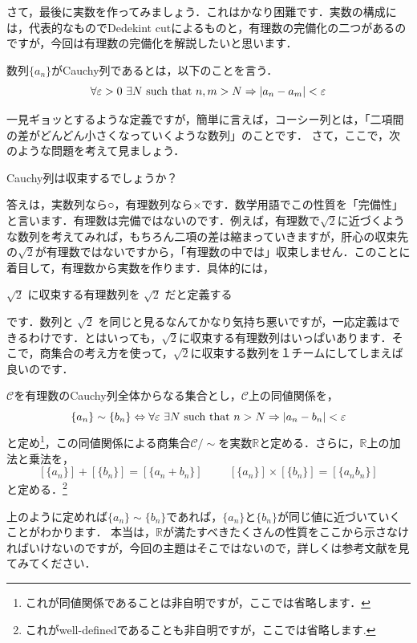 さて，最後に実数を作ってみましょう．これはかなり困難です．実数の構成には，代表的なものでDedekint cutによるものと，有理数の完備化の二つがあるのですが，今回は有理数の完備化を解説したいと思います．
\begin{defi}[Cauchy列]
 数列$\{a_n\}$がCauchy列であるとは，以下のことを言う．
 \[
  \forall \varepsilon >0 \ \exists N\  {\rm such\ that}\ n,m>N \Rightarrow |a_n-a_m|<\varepsilon
 \]
\end{defi}
一見ギョッとするような定義ですが，簡単に言えば，コーシー列とは，「二項間の差がどんどん小さくなっていくような数列」のことです．
さて，ここで，次のような問題を考えて見ましょう．
\begin{center}
 Cauchy列は収束するでしょうか？
\end{center}
答えは，実数列なら○，有理数列なら×です．数学用語でこの性質を「完備性」と言います．有理数は完備ではないのです．例えば，有理数で$\sqrt{2}$に近づくような数列を考えてみれば，もちろん二項の差は縮まっていきますが，肝心の収束先の$\sqrt{2}$が有理数ではないですから，「有理数の中では」収束しません．このことに着目して，有理数から実数を作ります．具体的には，
\begin{center}
  $\sqrt{2}$ に収束する有理数列を $\sqrt{2}$ だと定義する
\end{center}
です．数列と $\sqrt{2}$ を同じと見るなんてかなり気持ち悪いですが，一応定義はできるわけです．とはいっても，$\sqrt{2}$に収束する有理数列はいっぱいあります．そこで，商集合の考え方を使って，$\sqrt{2}$に収束する数列を１チームにしてしまえば良いのです．
\begin{defi}[実数]
$\mathcal{C}$を有理数のCauchy列全体からなる集合とし，$\mathcal{C}$上の同値関係を，
 \[
 \{a_n\}\sim\{b_n\}\Leftrightarrow \forall\varepsilon\  \exists N\  {\rm such\ that}\ n>N\Rightarrow |a_n-b_n|<\varepsilon
 \]
 と定め\footnote{これが同値関係であることは非自明ですが，ここでは省略します．}，この同値関係による商集合$\mathcal{C}/\sim$を実数$\mathbb{R}$と定める．さらに，$\mathbb{R}$上の加法と乗法を，
 \[
  [\{a_n\}]+[\{b_n\}]=[\{a_n+b_n\}]\hspace{1cm}[\{a_n\}]\times[\{b_n\}]=[\{a_nb_n\}]
 \]
 と定める．\footnote{これがwell-definedであることも非自明ですが，ここでは省略します.}
\end{defi}

上のように定めれば$\{a_n\}\sim\{b_n\}$であれば，$\{a_n\}$と$\{b_n\}$が同じ値に近づいていくことがわかります．
本当は，$\mathbb{R}$が満たすべきたくさんの性質をここから示さなければいけないのですが，今回の主題はそこではないので，詳しくは参考文献を見てみてください．

